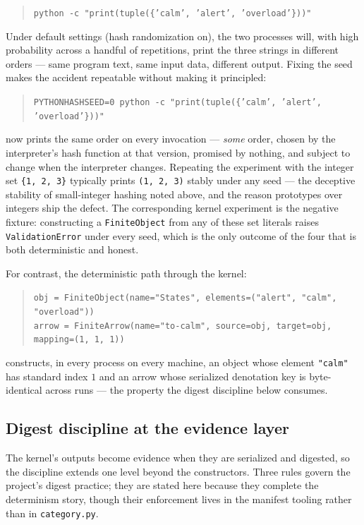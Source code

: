 \begin{quote}
\texttt{python -c "print(tuple(\{'calm', 'alert', 'overload'\}))"}
\end{quote}

Under default settings (hash randomization on), the two processes will,
with high probability across a handful of repetitions, print the three
strings in different orders --- same program text, same input data,
different output. Fixing the seed makes the accident repeatable without
making it principled:

\begin{quote}
\texttt{PYTHONHASHSEED=0 python -c "print(tuple(\{'calm', 'alert',
'overload'\}))"}
\end{quote}

now prints the same order on every invocation --- \emph{some} order,
chosen by the interpreter's hash function at that version, promised by
nothing, and subject to change when the interpreter changes. Repeating
the experiment with the integer set \texttt{\{1, 2, 3\}} typically
prints \texttt{(1, 2, 3)} stably under any seed --- the deceptive
stability of small-integer hashing noted above, and the reason
prototypes over integers ship the defect. The corresponding kernel
experiment is the negative fixture: constructing a \texttt{FiniteObject}
from any of these set literals raises \texttt{ValidationError} under
every seed, which is the only outcome of the four that is both
deterministic and honest.

For contrast, the deterministic path through the kernel:

\begin{quote}
\texttt{obj = FiniteObject(name="States", elements=("alert", "calm",
"overload"))}\\
\texttt{arrow = FiniteArrow(name="to-calm", source=obj, target=obj,
mapping=(1, 1, 1))}
\end{quote}

constructs, in every process on every machine, an object whose element
\texttt{"calm"} has standard index $1$ and an arrow whose serialized
denotation key is byte-identical across runs --- the property the
digest discipline below consumes.

\subsection{Digest discipline at the evidence layer}

The kernel's outputs become evidence when they are serialized and
digested, so the discipline extends one level beyond the constructors.
Three rules govern the project's digest practice; they are stated here
because they complete the determinism story, though their enforcement
lives in the manifest tooling rather than in \texttt{category.py}.

